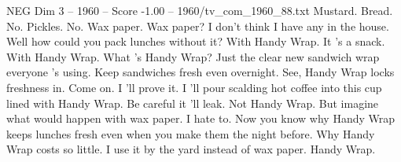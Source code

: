 \begin{textsample}{NEG Dim 3 – 1960 – Score -1.00 – 1960/tv\_com\_1960\_88.txt}  \label{ex:f3_neg_074}
Mustard.
Bread.
No.
Pickles.
No.
Wax paper.
Wax paper?
I don't think I have any in the house.
Well how could you pack lunches without it?
With Handy Wrap.
It 's a snack.
With Handy Wrap.
What 's Handy Wrap?
Just the clear new sandwich wrap everyone 's using.
Keep sandwiches fresh even overnight.
See, Handy Wrap locks freshness in.
Come on.
I 'll prove it.
I 'll pour scalding hot coffee into this cup lined with Handy Wrap.
Be careful it 'll leak.
Not Handy Wrap.
But imagine what would happen with wax paper.
I hate to.
Now you know why Handy Wrap keeps lunches fresh even when you make them the night before.
Why Handy Wrap costs so little.
I use it by the yard instead of wax paper.
Handy Wrap.

\end{textsample}
